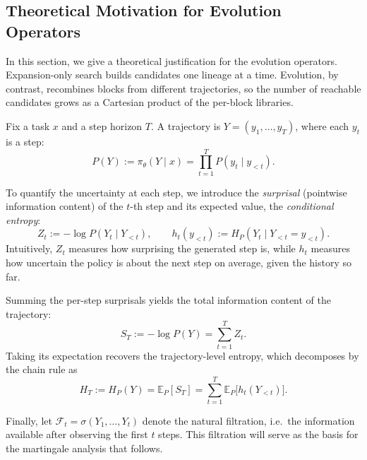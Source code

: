 \documentclass{llmxive}
\begin{document}
\subsection{Theoretical Motivation for Evolution Operators}
\label{app:theory-mutation}

In this section, we give a theoretical justification for the evolution operators. Expansion-only search builds candidates one lineage at a time. Evolution, by contrast, recombines blocks from different trajectories, so the number of reachable candidates grows as a Cartesian product of the per-block libraries.

Fix a task $x$ and a step horizon $T$. A trajectory is $Y=(y_1,\ldots,y_T)$, where each $y_t$ is a step:
\begin{equation}
  P(Y) := \pi_\theta(Y\mid x)
  =\prod_{t=1}^{T}P(y_t\mid y_{<t}).
\end{equation}

To quantify the uncertainty at each step, we introduce the \emph{surprisal} (pointwise information content) of the $t$-th step and its expected value, the \emph{conditional entropy}:
\begin{equation}
  Z_t := -\log P(Y_t \mid Y_{<t}),
  \qquad
  h_t(y_{<t}) := H_P(Y_t \mid Y_{<t} = y_{<t}).
\end{equation}
Intuitively, $Z_t$ measures how surprising the generated step is, while $h_t$ measures how uncertain the policy is about the next step on average, given the history so far.

Summing the per-step surprisals yields the total information content of the trajectory:
\begin{equation}
  S_T := -\log P(Y) = \sum_{t=1}^{T} Z_t.
\end{equation}
Taking its expectation recovers the trajectory-level entropy, which decomposes by the chain rule as
\begin{equation}
  H_T := H_P(Y) = \mathbb{E}_P[S_T]
  = \sum_{t=1}^{T} \mathbb{E}_P\bigl[h_t(Y_{<t})\bigr].
\end{equation}

Finally, let $\mathcal{F}_t = \sigma(Y_1,\dots,Y_t)$ denote the natural filtration, i.e.\ the information available after observing the first $t$ steps. This filtration will serve as the basis for the martingale analysis that follows.


\end{document}
